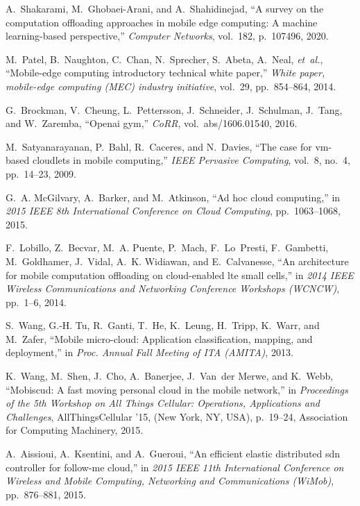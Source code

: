 \documentclass[conference]{IEEEtran}
\begin{document}
\begin{thebibliography}{1}

A.~Shakarami, M.~Ghobaei-Arani, and A.~Shahidinejad, ``A survey on the
  computation offloading approaches in mobile edge computing: A machine
  learning-based perspective,'' {\em Computer Networks}, vol.~182, p.~107496,
  2020.

M.~Patel, B.~Naughton, C.~Chan, N.~Sprecher, S.~Abeta, A.~Neal, {\em et~al.},
  ``Mobile-edge computing introductory technical white paper,'' {\em White
  paper, mobile-edge computing (MEC) industry initiative}, vol.~29,
  pp.~854--864, 2014.

G.~Brockman, V.~Cheung, L.~Pettersson, J.~Schneider, J.~Schulman, J.~Tang, and
  W.~Zaremba, ``Openai gym,'' {\em CoRR}, vol.~abs/1606.01540, 2016.

M.~Satyanarayanan, P.~Bahl, R.~Caceres, and N.~Davies, ``The case for vm-based
  cloudlets in mobile computing,'' {\em IEEE Pervasive Computing}, vol.~8,
  no.~4, pp.~14--23, 2009.

G.~A. McGilvary, A.~Barker, and M.~Atkinson, ``Ad hoc cloud computing,'' in
  {\em 2015 IEEE 8th International Conference on Cloud Computing},
  pp.~1063--1068, 2015.

F.~Lobillo, Z.~Becvar, M.~A. Puente, P.~Mach, F.~Lo~Presti, F.~Gambetti,
  M.~Goldhamer, J.~Vidal, A.~K. Widiawan, and E.~Calvanesse, ``An architecture
  for mobile computation offloading on cloud-enabled lte small cells,'' in {\em
  2014 IEEE Wireless Communications and Networking Conference Workshops
  (WCNCW)}, pp.~1--6, 2014.

S.~Wang, G.-H. Tu, R.~Ganti, T.~He, K.~Leung, H.~Tripp, K.~Warr, and M.~Zafer,
  ``Mobile micro-cloud: Application classification, mapping, and deployment,''
  in {\em Proc. Annual Fall Meeting of ITA (AMITA)}, 2013.

K.~Wang, M.~Shen, J.~Cho, A.~Banerjee, J.~Van~der Merwe, and K.~Webb,
  ``Mobiscud: A fast moving personal cloud in the mobile network,'' in {\em
  Proceedings of the 5th Workshop on All Things Cellular: Operations,
  Applications and Challenges}, AllThingsCellular '15, (New York, NY, USA),
  p.~19–24, Association for Computing Machinery, 2015.

A.~Aissioui, A.~Ksentini, and A.~Gueroui, ``An efficient elastic distributed
  sdn controller for follow-me cloud,'' in {\em 2015 IEEE 11th International
  Conference on Wireless and Mobile Computing, Networking and Communications
  (WiMob)}, pp.~876--881, 2015.


\end{thebibliography}
\end{document}
